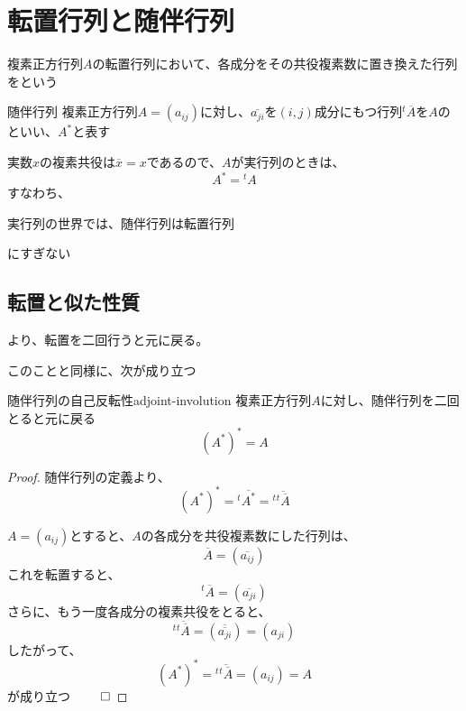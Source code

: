 \documentclass[../../../topic_linear-algebra]{subfiles}
\begin{document}
\sectionline
\section{転置行列と随伴行列}

複素正方行列$A$の転置行列において、各成分をその共役複素数に置き換えた行列をという

\begin{definition}{随伴行列}
  複素正方行列$A = (a_{ij})$に対し、$\overline{a_{ji}}$を$(i,j)$成分にもつ行列${}^t\overline{A}$を$A$のといい、$A^*$と表す
\end{definition}

実数$x$の複素共役は$\overline{x} = x$であるので、$A$が実行列のときは、
\begin{equation*}
  A^* = {}^t A
\end{equation*}
すなわち、
\begin{shaded}
  実行列の世界では、随伴行列は転置行列
\end{shaded}
にすぎない

\subsection{転置と似た性質}

より、転置を二回行うと元に戻る。

このことと同様に、次が成り立つ

\begin{theorem}{随伴行列の自己反転性}{adjoint-involution}
  複素正方行列$A$に対し、随伴行列を二回とると元に戻る
  \begin{equation*}
    (A^*)^* = A
  \end{equation*}
\end{theorem}

\begin{proof}
  随伴行列の定義より、
  \begin{equation*}
    (A^*)^* = {}^t\overline{A^*} = {}^t\overline{{}^t\overline{A}}
  \end{equation*}

  $A = (a_{ij})$とすると、$A$の各成分を共役複素数にした行列は、
  \begin{equation*}
    \overline{A} = (\overline{a_{ij}})
  \end{equation*}
  これを転置すると、
  \begin{equation*}
    {}^t\overline{A} = (\overline{a_{ji}})
  \end{equation*}
  さらに、もう一度各成分の複素共役をとると、
  \begin{equation*}
    {}^t\overline{{}^t\overline{A}} = (\overline{\overline{a_{ji}}}) = (a_{ji})
  \end{equation*}
  したがって、
  \begin{equation*}
    (A^*)^* = {}^t\overline{{}^t\overline{A}} = (a_{ij}) = A
  \end{equation*}
  が成り立つ $\qed$
\end{proof}
\end{document}
